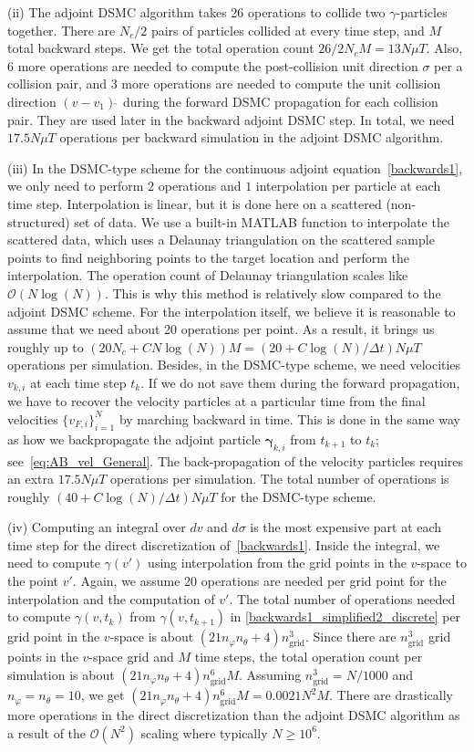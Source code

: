 \documentclass[times,final,nopreprintline]{elsarticle}
\newcommand{\bgamma}{\boldsymbol \gamma}
\newcommand{\cO}{\mathcal O} \newcommand{\cP}{\mathcal P}
\begin{document}
(ii) The adjoint DSMC algorithm takes 26 operations to collide two $\gamma$-particles together. There are $N_c/2$ pairs of particles collided at every time step, and $M$ total backward steps. We get the total operation count $26/2 N_c M = 13 N\mu T$. Also, $6$ more operations are needed to compute the post-collision unit direction $\sigma$ per a collision pair, and $3$ more operations are needed to compute the unit collision direction $(v-v_1){\hat ~}$ during the forward DSMC propagation for each collision pair. They are used later in the backward adjoint DSMC step. In total, we need $17.5 N\mu T$ operations per backward simulation in the adjoint DSMC algorithm.

(iii) In the DSMC-type scheme for the continuous adjoint equation~\eqref{backwards1}, we only need to perform $2$ operations and $1$ interpolation per particle at each time step. Interpolation is linear, but it is done here on a scattered (non-structured) set of data. We use a built-in MATLAB function to interpolate the scattered data, which uses a Delaunay triangulation on the scattered sample points to find neighboring points to the target location and perform the interpolation. The operation count of Delaunay triangulation scales like $\cO(N\log(N))$. This is why this method is relatively slow compared to the adjoint DSMC scheme. For the interpolation itself, we believe it is reasonable to assume that we need about 20 operations per point. As a result, it brings us roughly up to $(20 N_c + C N \log(N)) M = (20 + C \log(N)/\Delta t) N\mu T$ operations per simulation.
Besides, in the DSMC-type scheme, we need velocities $v_{k,i}$ at each time step $t_k$. If we do not save them during the forward propagation, we have to recover the velocity particles at a particular time from the final velocities $\{v_{F,i}\}_{i=1}^N$ by marching backward in time. This is done in the same way as how we backpropagate the adjoint particle $\bgamma_{k,i}$ from $t_{k+1}$ to $t_k$; see~\eqref{eq:AB_vel_General}. The back-propagation of the velocity particles requires an extra $17.5 N\mu T$ operations per simulation. The total number of operations is roughly $(40 + C \log(N)/\Delta t) N\mu T$ for the DSMC-type scheme.

(iv) Computing an integral over $dv$ and $d\sigma$ is the most expensive part at each time step for the direct discretization of~\eqref{backwards1}. Inside the integral, we need to compute $\gamma(v')$ using interpolation from the grid points in the $v$-space to the point $v'$. Again, we assume 20 operations are needed per grid point for the interpolation and the computation of $v'$.
The total number of operations needed to compute $\gamma(v,t_k)$ from $\gamma(v,t_{k+1})$ in \eqref{backwards1_simplified2_discrete} per grid point in the $v$-space is about $(21 n_{\varphi}n_{\theta}+4)n_\text{grid}^3$. Since there are $n_\text{grid}^3$ grid points in the $v$-space grid and $M$ time steps, the total operation count per simulation is about $(21 n_{\varphi}n_{\theta}+4)n_\text{grid}^6 M$.
Assuming $n_\text{grid}^3=N/1000$ and $n_{\varphi}=n_{\theta}=10$, we get $(21 n_{\varphi}n_{\theta}+4)n_\text{grid}^6 M = 0.0021 N^2 M$. There are drastically more operations in the direct discretization than the adjoint DSMC algorithm as a result of the $\cO(N^2)$ scaling where typically $N\geq10^6$.
\end{document}
